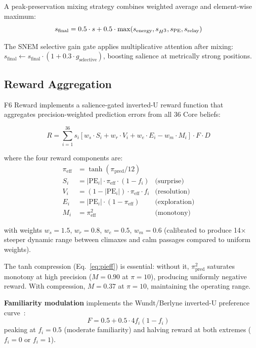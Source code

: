 \documentclass[10pt,twocolumn]{article}
\newcommand{\Hcube}{H\textsuperscript{3}}
\newcommand{\pe}{\mathrm{PE}}
\newcommand{\pipred}{\pi_{\mathrm{pred}}}
\newcommand{\pieff}{\pi_{\mathrm{eff}}}
\begin{document}
A peak-preservation mixing strategy combines weighted average and element-wise maximum:
\begin{equation}
s_{\text{final}} = 0.5 \cdot s + 0.5 \cdot \max(s_{\text{energy}}, s_{\Hcube}, s_{\pe}, s_{\text{relay}})
\end{equation}

The SNEM selective gain gate applies multiplicative attention after mixing:
$s_{\text{final}} \leftarrow s_{\text{final}} \cdot (1 + 0.3 \cdot g_{\text{selective}})$, boosting salience at metrically strong positions.

\subsection{Reward Aggregation}
\label{sec:reward}

F6 Reward implements a salience-gated inverted-U reward function that aggregates precision-weighted prediction errors from all 36 Core beliefs:

\begin{equation}
R = \sum_{i=1}^{36} s_i \left[ w_s \cdot S_i + w_r \cdot V_i + w_e \cdot E_i - w_m \cdot M_i \right] \cdot F \cdot D
\label{eq:reward}
\end{equation}

where the four reward components are:
\begin{align}
\pieff &= \tanh(\pipred / 12) \label{eq:pieff} \\
S_i &= |\pe_i| \cdot \pieff \cdot (1 - f_i) & \text{(surprise)} \label{eq:surprise} \\
V_i &= (1 - |\pe_i|) \cdot \pieff \cdot f_i & \text{(resolution)} \label{eq:resolution} \\
E_i &= |\pe_i| \cdot (1 - \pieff) & \text{(exploration)} \label{eq:exploration} \\
M_i &= \pieff^2 & \text{(monotony)} \label{eq:monotony}
\end{align}

with weights $w_s = 1.5$, $w_r = 0.8$, $w_e = 0.5$, $w_m = 0.6$ (calibrated to produce 14$\times$ steeper dynamic range between climaxes and calm passages compared to uniform weights).

The tanh compression (Eq.~\ref{eq:pieff}) is essential: without it, $\pipred^2$ saturates monotony at high precision ($M = 0.90$ at $\pi = 10$), producing uniformly negative reward.
With compression, $M = 0.37$ at $\pi = 10$, maintaining the operating range.

\textbf{Familiarity modulation} implements the Wundt/Berlyne inverted-U preference curve~\cite{berlyne1971}:
\begin{equation}
F = 0.5 + 0.5 \cdot 4 f_i (1 - f_i)
\label{eq:familiarity}
\end{equation}
peaking at $f_i = 0.5$ (moderate familiarity) and halving reward at both extremes ($f_i = 0$ or $f_i = 1$).
\end{document}

